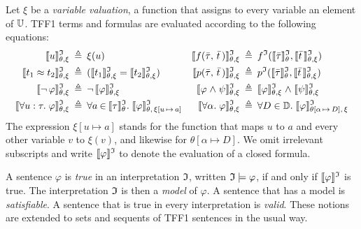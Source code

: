 Let $\xi$ be a {\em variable valuation}, a function that assigns
to every variable an element of $\mathbb{U}$. TFF1 terms
and formulas are evaluated according to the following equations:
\begin{align*}
\eval{u} &\eqdef \xi(u) &
\eval{f(\bar{\tau},\,\bar{t}\,)} &\eqdef f^\cI(\evalT{\bar{\tau}},\eval{\bar{t}\,}) \\
\eval{t_1 \eq t_2} &\eqdef (\eval{t_1} = \eval{t_2}) &
\eval{p(\bar{\tau},\,\bar{t}\,)} &\eqdef p^\cI(\evalT{\bar{\tau}},\eval{\bar{t}\,}) \\
\eval{\lnot\, \varphi} &\eqdef \lnot\, \eval{\varphi} &
\eval{\varphi \rand \psi} &\eqdef \eval{\varphi} \rand \eval{\psi} \\
\eval{\forall u \ty \tau .\; \varphi} &\eqdef \forall {a \mathbin\in \evalT{\tau}} .\;
\evalG{\varphi}_{\theta,\,\xi[u\,\mapsto\,a]} &
\eval{\forall \alpha .\; \varphi} &\eqdef \forall {D \in \sorts} .\;
\evalG{\varphi}_{\theta[\alpha\,\mapsto\,D],\,\xi} %
\end{align*}
The expression $\xi[u \mapsto a]$ stands for the function
that maps $u$ to $a$ and every other variable $v$ to $\xi(v)$, and likewise for
$\theta[\alpha \mapsto D]$.
We omit irrelevant subscripts and write
$\llbracket\varphi\rrbracket^{\mathfrak{I}}$ to denote the evaluation of a closed formula.

A sentence $\varphi$ is {\em true} in an interpretation $\mathfrak{I}$,
written $\mathfrak{I} \models \varphi$, if and only if $\llbracket\varphi\rrbracket^{\mathfrak{I}}$ is true.
The interpretation $\mathfrak{I}$ is then a {\em model\/} of $\varphi$.
A sentence that has a model is {\em satisfiable}.
A sentence that is true in every interpretation is {\em valid}.
These notions are extended to sets and sequents of TFF1 sentences in
the usual way.
